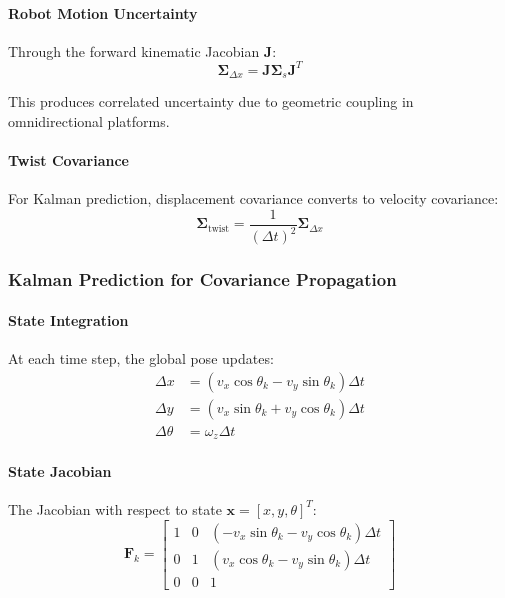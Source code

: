 \paragraph{Robot Motion Uncertainty}
Through the forward kinematic Jacobian $\mathbf{J}$:
\begin{equation}
\boldsymbol{\Sigma}_{\Delta x} = \mathbf{J} \boldsymbol{\Sigma}_s \mathbf{J}^T
\label{eq:motion_covariance}
\end{equation}

This produces correlated uncertainty due to geometric coupling in omnidirectional platforms.

\paragraph{Twist Covariance}
For Kalman prediction, displacement covariance converts to velocity covariance:
\begin{equation}
\boldsymbol{\Sigma}_{\text{twist}} = \frac{1}{(\Delta t)^2} \boldsymbol{\Sigma}_{\Delta x}
\label{eq:twist_covariance}
\end{equation}

\subsubsection{Kalman Prediction for Covariance Propagation}

\paragraph{State Integration}
At each time step, the global pose updates:
\begin{align}
\Delta x &= (v_x \cos\theta_k - v_y \sin\theta_k) \Delta t \label{eq:delta_x} \\
\Delta y &= (v_x \sin\theta_k + v_y \cos\theta_k) \Delta t \label{eq:delta_y} \\
\Delta \theta &= \omega_z \Delta t \label{eq:delta_theta}
\end{align}

\paragraph{State Jacobian}
The Jacobian with respect to state $\mathbf{x} = [x, y, \theta]^T$:
\begin{equation}
\mathbf{F}_k = \begin{bmatrix} 1 & 0 & (-v_x \sin\theta_k - v_y \cos\theta_k) \Delta t \\ 0 & 1 & (v_x \cos\theta_k - v_y \sin\theta_k) \Delta t \\ 0 & 0 & 1 \end{bmatrix}
\label{eq:state_jacobian}
\end{equation}

